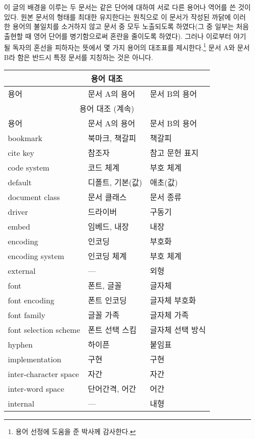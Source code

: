 이 글의 배경을 이루는 두 문서는 같은 단어에 대하여 서로 다른
용어나 역어를 쓴 것이 있다. 원본 문서의 형태를 최대한 유지한다는
원칙으로 이 문서가 작성된 까닭에 이러한 용어의 불일치를 소거하지
않고 문서 중 모두 노출되도록 하였다(그 중 일부는 처음 출현할
때 영어 단어를 병기함으로써 혼란을 줄이도록 하였다). 그러나
이로부터 야기될 
독자의 혼선을 피하자는 뜻에서 몇 가지 용어의 대조표를
제시한다.\footnote{용어 선정에 도움을 준  박사께 감사한다.}
문서 A와 문서 B라 함은 반드시 특정 문서를 지칭하는 것은 아니다.

\begin{longtable}{lll}
\multicolumn{3}{c}{\centering 용어 대조} \\ \hline
용어 & 문서 A의 용어 & 문서 B의 용어 \\ \hline
\endfirsthead
\multicolumn{3}{c}{\centering 용어 대조 (계속)} \\ \hline
용어 & 문서 A의 용어 & 문서 B의 용어 \\ \hline
\endhead
\hline
\endfoot

bookmark & 북마크, 책갈피 & 책갈피 \\

cite key & 참조자 & 참고 문헌 표지 \\
code system & 코드 체계 & 부호 체계 \\

default & 디폴트, 기본(값) & 애초(값) \\
document class & 문서 클래스 & 문서 종류 \\
driver & 드라이버 & 구동기 \\

embed & 임베드, 내장 & 내장 \\
encoding & 인코딩 & 부호화 \\
encoding system & 인코딩 체계 & 부호 체계 \\
external & --- & 외형 \\

font & 폰트, 글꼴 & 글자체 \\
font encoding & 폰트 인코딩 & 글자체 부호화 \\
font family & 글꼴 가족 & 글자체 가족 \\
font selection scheme & 폰트 선택 스킴 & 글자체 선택 방식 \\

hyphen & 하이픈 & 붙임표 \\

implementation & 구현 & 구현 \\
inter-character space & 자간 & 자간 \\
inter-word space & 단어간격, 어간 & 어간 \\
internal & --- & 내형 \\


\end{longtable}

